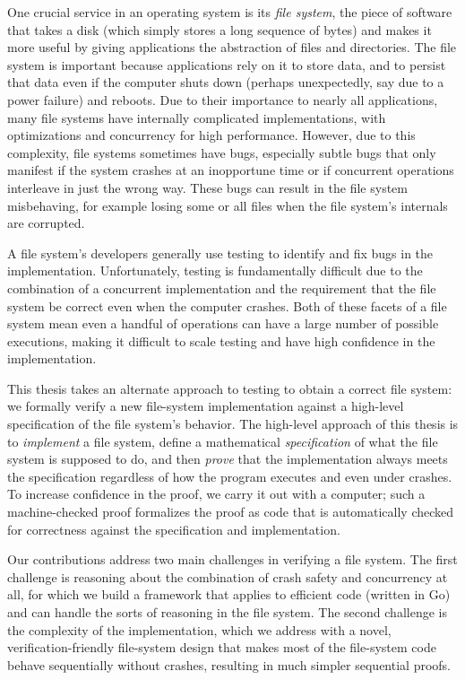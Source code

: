 One crucial service in an operating system is its \emph{file system}, the piece
of software that takes a disk (which simply stores a long sequence of bytes) and
makes it more useful by giving applications the abstraction of files and directories. The file
system is important because applications rely on it to store data, and to
persist that data even if the computer shuts down (perhaps unexpectedly, say due
to a power failure) and reboots. Due to their importance to nearly all applications, many
file systems have internally complicated implementations, with optimizations and
concurrency for high performance. However, due to this complexity, file systems
sometimes have bugs, especially subtle bugs that only manifest if the system
crashes at an inopportune time or if concurrent operations interleave in just
the wrong way. These bugs can result in the file system misbehaving, for example
losing some or all files when the file system's internals are corrupted.

A file system's developers generally use testing to identify and fix bugs in the
implementation. Unfortunately, testing is fundamentally difficult due to the
combination of a concurrent implementation and the requirement that the file
system be correct even when the computer crashes. Both of these facets of a file
system mean even a handful of operations can have a large number of possible
executions, making it difficult to scale testing and have high confidence in the
implementation.

This thesis takes an alternate approach to testing to obtain a correct file
system: we formally verify a new file-system implementation against a high-level
specification of the file system's behavior. The high-level approach of this
thesis is to \emph{implement} a file system, define a mathematical
\emph{specification} of what the file system is supposed to do, and then
\emph{prove} that the implementation always meets the specification regardless
of how the program executes and even under crashes. To increase confidence in
the proof, we carry it out with a computer; such a machine-checked proof
formalizes the proof as code that is automatically checked
for correctness against the specification and implementation.

Our contributions address two main challenges in verifying a file system. The
first challenge is reasoning about the combination of crash safety and
concurrency at all, for which we build a framework that applies to efficient
code (written in Go) and can handle the sorts of reasoning in the file system.
The second challenge is the complexity of the implementation, which we address
with a novel, verification-friendly file-system design that makes most of the
file-system code behave sequentially without crashes, resulting in much simpler
sequential proofs.

